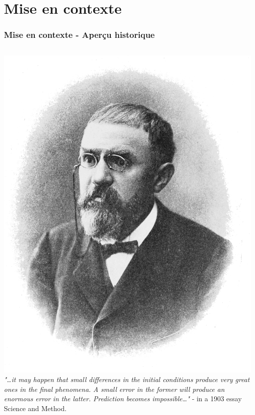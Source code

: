 \section{Mise en contexte}

\begin{frame}
    \begin{center}
    \vspace{0.5cm}
    \end{center}
\end{frame}

\begin{frame}
    \frametitle{Mise en contexte - Aperçu historique}
    \begin{columns}
        \centering
        \includegraphics[scale=0.06]{figures/henri_poincare.png}
        \textit{"\dots it may happen that small differences in the initial conditions produce very great ones in the final phenomena. A small error in the former will produce an enormous error in the latter. Prediction becomes impossible\dots"} - in a 1903 essay Science and Method.
    \end{columns} 
\end{frame}

